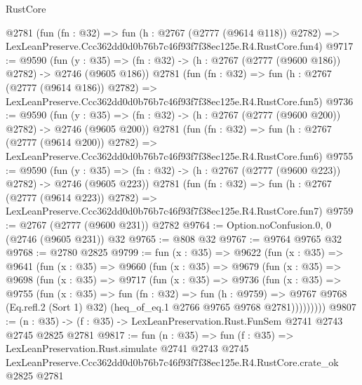 \begin{lexlean}{RustCore}
\begin{coremodule}
    @2781
    (fun (fn : @32) =>
    fun (h : @2767 (@2777 (@9614 @118)) @2782) =>
    LexLeanPreserve.Ccc362dd0d0b76b7c46f93f7f38ec125e.R4.RustCore.fun4)
@9717 := @9590
    (fun (y : @35) => (fn : @32) -> (h : @2767 (@2777 (@9600 @186)) @2782) -> @2746 (@9605 @186))
    @2781
    (fun (fn : @32) =>
    fun (h : @2767 (@2777 (@9614 @186)) @2782) =>
    LexLeanPreserve.Ccc362dd0d0b76b7c46f93f7f38ec125e.R4.RustCore.fun5)
@9736 := @9590
    (fun (y : @35) => (fn : @32) -> (h : @2767 (@2777 (@9600 @200)) @2782) -> @2746 (@9605 @200))
    @2781
    (fun (fn : @32) =>
    fun (h : @2767 (@2777 (@9614 @200)) @2782) =>
    LexLeanPreserve.Ccc362dd0d0b76b7c46f93f7f38ec125e.R4.RustCore.fun6)
@9755 := @9590
    (fun (y : @35) => (fn : @32) -> (h : @2767 (@2777 (@9600 @223)) @2782) -> @2746 (@9605 @223))
    @2781
    (fun (fn : @32) =>
    fun (h : @2767 (@2777 (@9614 @223)) @2782) =>
    LexLeanPreserve.Ccc362dd0d0b76b7c46f93f7f38ec125e.R4.RustCore.fun7)
@9759 := @2767 (@2777 (@9600 @231)) @2782
@9764 := Option.noConfusion.{0, 0} (@2746 (@9605 @231)) @32
@9765 := @808 @32
@9767 := @9764 @9765 @32
@9768 := @2780 @2825
@9799 := fun (x : @35) =>
  @9622
    (fun (x : @35) =>
    @9641
      (fun (x : @35) =>
      @9660
        (fun (x : @35) =>
        @9679
          (fun (x : @35) =>
          @9698
            (fun (x : @35) =>
            @9717
              (fun (x : @35) =>
              @9736
                (fun (x : @35) =>
                @9755
                  (fun (x : @35) =>
                  fun (fn : @32) =>
                  fun (h : @9759) =>
                  @9767
                    @9768
                    (Eq.refl.{2} (Sort 1) @32)
                    (heq_of_eq.{1} @2766 @9765 @9768 @2781)))))))))
@9807 := (n : @35) -> (f : @35) -> LexLeanPreservation.Rust.FunSem @2741 @2743 @2745 @2825 @2781
@9817 := fun (n : @35) =>
  fun (f : @35) =>
  LexLeanPreservation.Rust.simulate
    @2741
    @2743
    @2745
    LexLeanPreserve.Ccc362dd0d0b76b7c46f93f7f38ec125e.R4.RustCore.crate_ok
    @2825
    @2781
\end{coremodule}
\end{lexlean}
